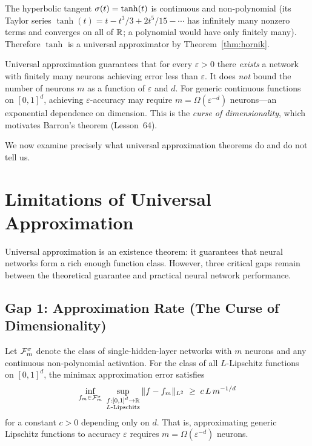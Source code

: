 \documentclass[11pt,a4paper]{article}
\begin{document}
\begin{example}
\label{ex:tanh}
The hyperbolic tangent $\sigma(t) = \tanh(t)$ is continuous and
non-polynomial (its Taylor series $\tanh(t) = t - t^3/3 + 2t^5/15 - \cdots$
has infinitely many nonzero terms and converges on all of $\mathbb{R}$; a polynomial
would have only finitely many).  Therefore $\tanh$ is a universal
approximator by Theorem~\ref{thm:hornik}.
\end{example}

\begin{warning}[title={Density Does Not Imply Efficient Approximation}]
Universal approximation guarantees that for every $\varepsilon > 0$ there
\emph{exists} a network with finitely many neurons achieving error less than
$\varepsilon$.  It does \emph{not} bound the number of neurons $m$ as a
function of $\varepsilon$ and $d$.  For generic continuous functions on
$[0,1]^d$, achieving $\varepsilon$-accuracy may require
$m = \Omega(\varepsilon^{-d})$ neurons---an exponential dependence on
dimension.  This is the \emph{curse of dimensionality}, which motivates
Barron's theorem (Lesson~64).
\end{warning}

We now examine precisely what universal approximation theorems do and do
not tell us.

\section{Limitations of Universal Approximation}
\label{sec:limitations}

Universal approximation is an existence theorem: it guarantees that neural
networks form a rich enough function class.  However, three critical gaps
remain between the theoretical guarantee and practical neural network
performance.

\subsection{Gap 1: Approximation Rate (The Curse of Dimensionality)}
\label{sec:curse}

\begin{proposition}
\label{prop:lower-bound}
Let $\mathcal{F}_m^{\sigma}$ denote the class of single-hidden-layer
networks with $m$ neurons and any continuous non-polynomial activation.
For the class of all $L$-Lipschitz functions on $[0,1]^d$, the minimax
approximation error satisfies
\[
  \inf_{f_m \in \mathcal{F}_m^{\sigma}} \;
  \sup_{\substack{f : [0,1]^d \to \mathbb{R} \\ \text{$L$-Lipschitz}}}
  \|f - f_m\|_{L^2}
  \;\ge\;
  c \, L \, m^{-1/d}
\]
for a constant $c > 0$ depending only on $d$.  That is, approximating
generic Lipschitz functions to accuracy $\varepsilon$ requires
$m = \Omega(\varepsilon^{-d})$ neurons.
\end{proposition}
\end{document}
